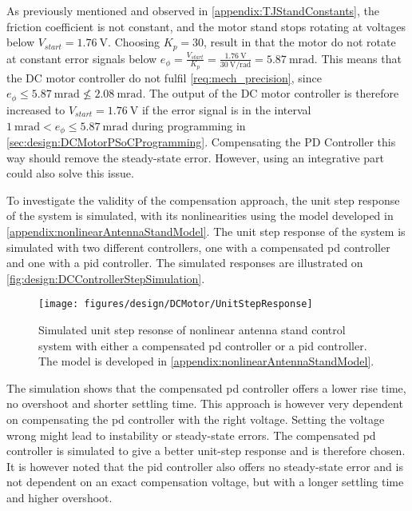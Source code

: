 As previously mentioned and observed in \autoref{appendix:TJStandConstants}, the friction coefficient is not constant, and the motor stand stops rotating at voltages below $V_{start}=\SI{1.76}{\volt}$. Choosing $K_p = 30$, result in that the motor do not rotate at constant error signals below $e_{\phi} = \frac{V_{start}}{K_p} =  \frac{\SI{1.76}{\volt}}{\SI{30}{\volt\per\radian}} = \SI{5.87}{\milli\radian}$. This means that the DC motor controller do not fulfil \autoref{req:mech_precision}, since $e_{\phi} \leq \SI{5.87}{\milli\radian} \nleq \SI{2.08}{\milli\radian}$. The output of the DC motor controller is therefore increased to $V_{start} = \SI{1.76}{\volt}$ if the error signal is in the interval $\SI{1}{\milli\radian} < e_\phi \leq \SI{5.87}{\milli\radian}$ during programming in \autoref{sec:design:DCMotorPSoCProgramming}. Compensating the PD Controller this way should remove the steady-state error. However, using an integrative part could also solve this issue.

To investigate the validity of the compensation approach, the unit step response of the system is simulated, with its nonlinearities using the model developed in \autoref{appendix:nonlinearAntennaStandModel}. The unit step response of the system is simulated with two different controllers, one with a compensated \gls{pd} controller and one with a \gls{pid} controller. The simulated responses are illustrated on \autoref{fig:design:DCControllerStepSimulation}.
\begin{figure}[h!]
\centering
\texttt{[image: figures/design/DCMotor/UnitStepResponse]}
\caption{Simulated unit step resonse of nonlinear antenna stand control system with either a compensated \gls{pd} controller or a \gls{pid} controller. The model is developed in \autoref{appendix:nonlinearAntennaStandModel}.}\label{fig:design:DCControllerStepSimulation}
\end{figure}

The simulation shows that the compensated \gls{pd} controller offers a lower rise time, no overshoot and shorter settling time. This approach is however very dependent on compensating the \gls{pd} controller with the right voltage. Setting the voltage wrong might lead to instability or steady-state errors. The compensated \gls{pd} controller is simulated to give a better unit-step response and is therefore chosen. It is however noted that the \gls{pid} controller also offers no steady-state error and is not dependent on an exact compensation voltage, but with a longer settling time and higher overshoot.

